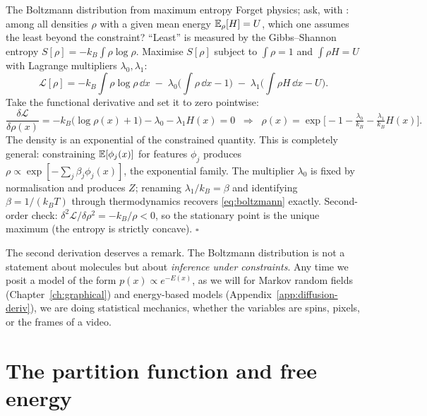 \begin{toolbox}[tb:maxent]{The Boltzmann distribution from maximum entropy}
Forget physics; ask, with \citet{jaynes1957information}: among all
densities $\rho$ with a given mean energy $\mathbb{E}_\rho[H] = U$, which one
assumes the least beyond the constraint? ``Least'' is measured by the
Gibbs--Shannon entropy $S[\rho] = -k_B \int \rho \log \rho$. Maximise
$S[\rho]$ subject to $\int \rho = 1$ and $\int \rho H = U$ with Lagrange
multipliers $\lambda_0, \lambda_1$:
\begin{equation*}
  \mathcal{L}[\rho]
  = -k_B \!\int\! \rho \log \rho \,\dd x
  \;-\; \lambda_0 \Big( \!\int\! \rho \,\dd x - 1 \Big)
  \;-\; \lambda_1 \Big( \!\int\! \rho H \,\dd x - U \Big).
\end{equation*}
Take the functional derivative and set it to zero pointwise:
\begin{equation*}
  \frac{\delta \mathcal{L}}{\delta \rho(x)}
  = -k_B\big(\log \rho(x) + 1\big) - \lambda_0 - \lambda_1 H(x) = 0
  \;\;\Longrightarrow\;\;
  \rho(x) = \exp\!\Big[-1 - \tfrac{\lambda_0}{k_B} - \tfrac{\lambda_1}{k_B} H(x)\Big].
\end{equation*}
The density is an exponential of the constrained quantity. This is
completely general: constraining $\mathbb{E}[\phi_j(x)]$ for features $\phi_j$
produces $\rho \propto \exp[-\sum_j \beta_j \phi_j(x)]$, the exponential
family. The multiplier $\lambda_0$ is fixed by normalisation and produces
$Z$; renaming $\lambda_1/k_B = \beta$ and identifying $\beta = 1/(k_B T)$
through thermodynamics recovers \eqref{eq:boltzmann} exactly.
Second-order check:
$\delta^2 \mathcal{L} / \delta \rho^2 = -k_B/\rho < 0$, so the stationary
point is the unique maximum (the entropy is strictly concave).
\hfill$\square$
\end{toolbox}

The second derivation deserves a remark. The Boltzmann distribution is
not a statement about molecules but about \emph{inference under
constraints}. Any time we posit a model of the form
$p(x) \propto e^{-E(x)}$, as we will for Markov random fields
(Chapter~\ref{ch:graphical}) and energy-based models
(Appendix~\ref{app:diffusion-deriv}), we are doing statistical mechanics, whether the
variables are spins, pixels, or the frames of a video.

\section{The partition function and free energy}\label{sec:free-energy}

